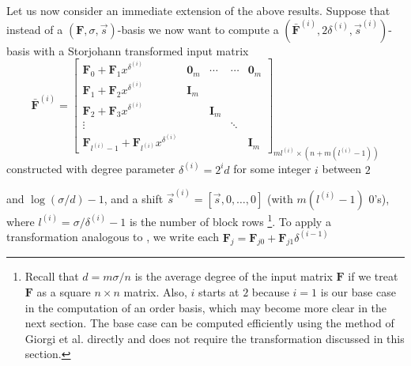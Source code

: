 Let us now consider an immediate extension of the above results. Suppose
that instead of a $\left(\mathbf{F},\sigma,\vec{s}\right)$-basis
we now want to compute a $(\bar{\mathbf{F}}^{\left(i\right)},2\delta^{\left(i\right)},\vec{s}^{\left(i\right)})$-basis
with a Storjohann transformed input matrix \[
\bar{\mathbf{F}}^{\left(i\right)}=\left[\begin{array}{c|cccc}
\mathbf{F}_{0}+\mathbf{F}_{1}x^{\delta^{\left(i\right)}} & \mathbf{0}_{m} & \cdots & \mathbf{\cdots} & \mathbf{0}_{m}\\
\hline \mathbf{F}_{1}+\mathbf{F}_{2}x^{\delta^{\left(i\right)}} & \mathbf{I}_{m}\\
\mathbf{F}_{2}+\mathbf{F}_{3}x^{\delta^{\left(i\right)}} &  & \mathbf{I}_{m}\\
\vdots &  &  & \ddots\\
\mathbf{F}_{l^{\left(i\right)}-1}+\mathbf{F}_{l^{\left(i\right)}}x^{\delta^{\left(i\right)}} &  &  &  & \mathbf{I}_{m}\end{array}\right]_{ml^{(i)}\times(n+m(l^{(i)}-1))}\]
 constructed with degree parameter $\delta^{\left(i\right)}=2^{i}d$
for some integer $i$ between $2$%
\begin{comment}
the base case is $i=1$ and problem is not to be subdivided 
\end{comment}
{} and $\log\left(\sigma/d\right)-1$, and a shift $\vec{s}^{\left(i\right)}=[\vec{s},0,\dots,0]$
(with $m(l^{\left(i\right)}-1)$ 0's), where $l^{\left(i\right)}=\sigma/\delta^{\left(i\right)}-1$
is the number of block rows%
\footnote{Recall that $d=m\sigma/n$ is the average degree of the input matrix
$\mathbf{F}$ if we treat $\mathbf{F}$ as a square $n\times n$ matrix.
Also, $i$ starts at $2$ because $i=1$ is our base case in the computation
of an order basis, which may become more clear in the next section.
The base case can be computed efficiently using the method of Giorgi
et al. \citeyearpar{Giorgi2003} directly and does not require the
transformation discussed in this section.%
}. To apply a transformation analogous to ,
we write each $\mathbf{F}_{j}=\mathbf{F}_{j0}+\mathbf{F}_{j1}\delta^{\left(i-1\right)}$
